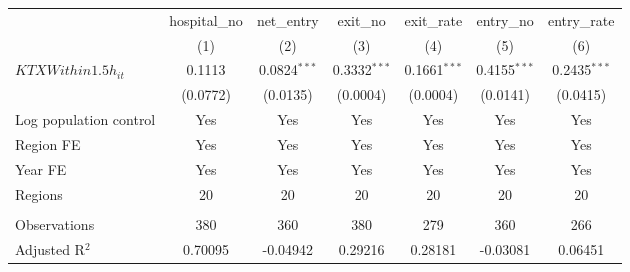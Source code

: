 \begingroup
\centering
\begin{tabular}{lcccccc}
   \toprule
                          & hospital\_no  & net\_entry     & exit\_no       & exit\_rate     & entry\_no      & entry\_rate \\    
                          & (1)           & (2)            & (3)            & (4)            & (5)            & (6)\\  
   \midrule 
   $KTXWithin1.5h_{it}$   & 0.1113        & 0.0824$^{***}$ & 0.3332$^{***}$ & 0.1661$^{***}$ & 0.4155$^{***}$ & 0.2435$^{***}$\\   
                          & (0.0772)      & (0.0135)       & (0.0004)       & (0.0004)       & (0.0141)       & (0.0415)\\   
   Log population control & Yes           & Yes            & Yes            & Yes            & Yes            & Yes\\  
   Region FE              & Yes           & Yes            & Yes            & Yes            & Yes            & Yes\\  
   Year FE                & Yes           & Yes            & Yes            & Yes            & Yes            & Yes\\  
   Regions                & 20            & 20             & 20             & 20             & 20             & 20\\  
    \\
   Observations           & 380           & 360            & 380            & 279            & 360            & 266\\  
   Adjusted R$^2$         & 0.70095       & -0.04942       & 0.29216        & 0.28181        & -0.03081       & 0.06451\\  
   \bottomrule
\end{tabular}
\par\endgroup
